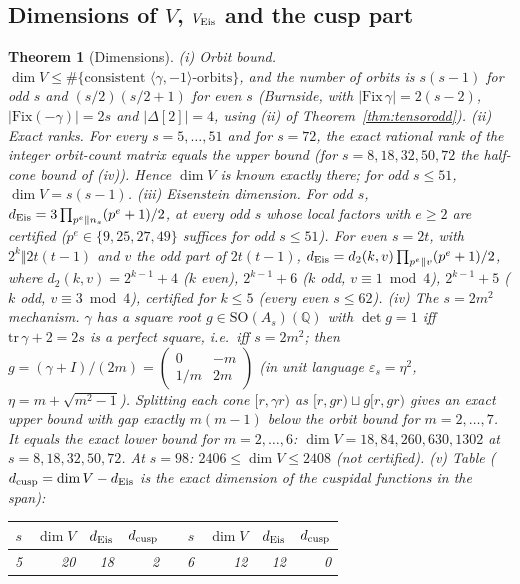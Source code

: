 \documentclass[11pt]{article}
\newtheorem{theorem}{Theorem}[section]
\theoremstyle{definition}
\newcommand{\Q}{\mathbb{Q}}
\begin{document}
\subsection{Dimensions of $V$, $V_{\rm Eis}$ and the cusp part}
\begin{theorem}[Dimensions]\label{thm:dims}
(i) \emph{Orbit bound.} $\dim V\le\#\{\text{consistent }\langle\gamma,-1\rangle\text{-orbits}\}$, and the number of orbits is $s(s-1)$ for odd $s$ and
$(s/2)(s/2+1)$ for even $s$ (Burnside, with $|\mathrm{Fix}\,\gamma|=2(s-2)$, $|\mathrm{Fix}(-\gamma)|=2s$ and $|\Delta[2]|=4$, using (ii) of Theorem~\ref{thm:tensorodd}).
(ii) \emph{Exact ranks.} For every $s=5,\dots,51$ and for $s=72$, the exact rational rank of the integer orbit-count matrix equals the upper bound
(for $s=8,18,32,50,72$ the half-cone bound of (iv)). Hence $\dim V$ is known exactly there; for odd $s\le51$, $\dim V=s(s-1)$.
(iii) \emph{Eisenstein dimension.} For odd $s$, $d_{\rm Eis}=3\prod_{p^e\Vert n_s}(p^e+1)/2$, at every odd $s$ whose local factors with $e\ge2$ are certified
($p^e\in\{9,25,27,49\}$ suffices for odd $s\le51$). For even $s=2t$, with $2^k\Vert2t(t-1)$ and $v$ the odd part of $2t(t-1)$,
$d_{\rm Eis}=d_2(k,v)\prod_{p^e\Vert v}(p^e+1)/2$, where $d_2(k,v)=2^{k-1}+4$ ($k$ even), $2^{k-1}+6$ ($k$ odd, $v\equiv1\bmod4$), $2^{k-1}+5$ ($k$ odd,
$v\equiv3\bmod4$), certified for $k\le5$ (every even $s\le62$).
(iv) \emph{The $s=2m^2$ mechanism.} $\gamma$ has a square root $g\in\mathrm{SO}(A_s)(\Q)$ with $\det g=1$ iff $\mathrm{tr}\,\gamma+2=2s$ is a perfect square, i.e.\ iff
$s=2m^2$; then $g=(\gamma+I)/(2m)=\begin{pmatrix}0&-m\\1/m&2m\end{pmatrix}$ (in unit language $\varepsilon_s=\eta^2$, $\eta=m+\sqrt{m^2-1}$). Splitting each cone
$[r,\gamma r)$ as $[r,gr)\sqcup g[r,gr)$ gives an exact upper bound with gap exactly $m(m-1)$ below the orbit bound for $m=2,\dots,7$. It equals the exact lower
bound for $m=2,\dots,6$: $\dim V=18,84,260,630,1302$ at $s=8,18,32,50,72$. At $s=98$: $2406\le\dim V\le2408$ (not certified).
(v) \emph{Table} ($d_{\rm cusp}=\dim V-d_{\rm Eis}$ is the exact dimension of the cuspidal functions in the span):
\begin{center}\small
\begin{longtable}{rrrrcrrrr}\toprule
$s$ & $\dim V$ & $d_{\rm Eis}$ & $d_{\rm cusp}$ && $s$ & $\dim V$ & $d_{\rm Eis}$ & $d_{\rm cusp}$\\\midrule\endhead
5 & 20 & 18 & 2 && 6 & 12 & 12 & 0\\

\end{longtable}
\end{center}
\end{theorem}
\end{document}
